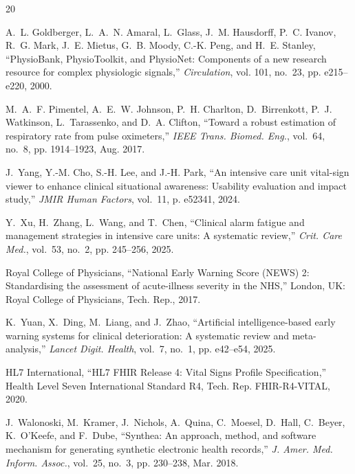 \documentclass[10pt,journal,compsoc]{IEEEtran}
\begin{document}
\begin{thebibliography}{20}

A.~L. Goldberger, L.~A.~N. Amaral, L.~Glass, J.~M. Hausdorff, P.~C. Ivanov, R.~G. Mark, J.~E. Mietus, G.~B. Moody, C.-K. Peng, and H.~E. Stanley, ``{PhysioBank, PhysioToolkit, and PhysioNet}: Components of a new research resource for complex physiologic signals,'' \emph{Circulation}, vol. 101, no.~23, pp. e215--e220, 2000.

M.~A.~F. Pimentel, A.~E.~W. Johnson, P.~H. Charlton, D.~Birrenkott, P.~J. Watkinson, L.~Tarassenko, and D.~A. Clifton, ``Toward a robust estimation of respiratory rate from pulse oximeters,'' \emph{IEEE Trans. Biomed. Eng.}, vol.~64, no.~8, pp. 1914--1923, Aug. 2017.

J.~Yang, Y.-M. Cho, S.-H. Lee, and J.-H. Park, ``An intensive care unit vital-sign viewer to enhance clinical situational awareness: Usability evaluation and impact study,'' \emph{JMIR Human Factors}, vol.~11, p. e52341, 2024.

Y.~Xu, H.~Zhang, L.~Wang, and T.~Chen, ``Clinical alarm fatigue and management strategies in intensive care units: A systematic review,'' \emph{Crit. Care Med.}, vol.~53, no.~2, pp. 245--256, 2025.

{Royal College of Physicians}, ``{National Early Warning Score (NEWS) 2}: Standardising the assessment of acute-illness severity in the {NHS},'' London, UK: Royal College of Physicians, Tech. Rep., 2017.

K.~Yuan, X.~Ding, M.~Liang, and J.~Zhao, ``Artificial intelligence-based early warning systems for clinical deterioration: A systematic review and meta-analysis,'' \emph{Lancet Digit. Health}, vol.~7, no.~1, pp. e42--e54, 2025.

{HL7 International}, ``{HL7 FHIR Release 4: Vital Signs Profile Specification},'' Health Level Seven International Standard R4, Tech. Rep. FHIR-R4-VITAL, 2020.

J.~Walonoski, M.~Kramer, J.~Nichols, A.~Quina, C.~Moesel, D.~Hall, C.~Beyer, K.~O'Keefe, and F.~Dube, ``Synthea: An approach, method, and software mechanism for generating synthetic electronic health records,'' \emph{J. Amer. Med. Inform. Assoc.}, vol.~25, no.~3, pp. 230--238, Mar. 2018.


\end{thebibliography}
\end{document}
